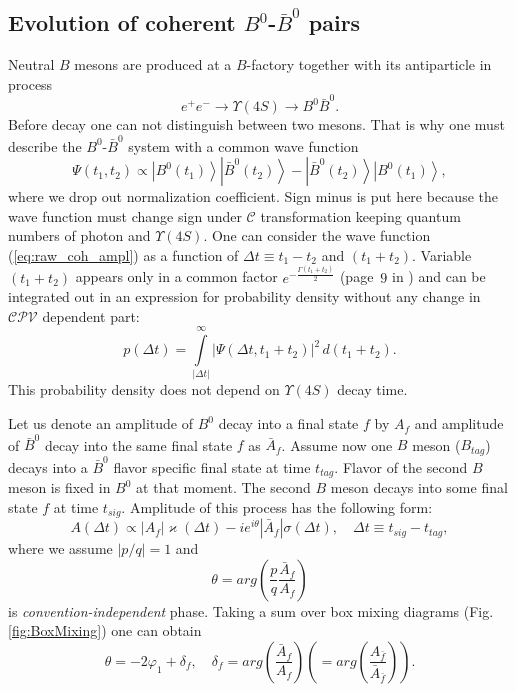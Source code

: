\documentclass[preprint,aps,showpacs]{revtex4}
\newcommand{\kapdt}{\varkappa\left(\Delta t\right)}
\newcommand{\sigdt}{\sigma\left(\Delta t\right)}
\newcommand{\dt}{\ensuremath{\Delta t}\xspace}
\newcommand{\cconj}{\ensuremath{\mathcal{C}}\xspace}
\newcommand{\cpvconj}{\ensuremath{\mathcal{CPV}}\xspace}
\newcommand{\bzta}{\left|B^0\left(t_1\right)\right>}
\newcommand{\bzbtb}{\left|\bar B^0\left(t_2\right)\right>}
\begin{document}
\subsection{Evolution of coherent $B^0$-$\bar B^0$ pairs}
Neutral $B$ mesons are produced at a $B$-factory together with its antiparticle in process
\begin{equation}
 e^+e^-\to\Upsilon(4S)\to B^0\bar B^0.
\end{equation}
Before decay one can not distinguish between two mesons. That is why one must describe the $B^0$-$\bar B^0$ system with a common wave function
\begin{equation}\label{eq:raw_coh_ampl}
 \Psi(t_1,t_2) \propto \bzta\bzbtb - \bzbtb\bzta,
\end{equation}
where we drop out normalization coefficient. Sign minus is put here because the wave function must change sign under \cconj transformation keeping quantum numbers of photon and $\Upsilon(4S)$. One can consider the wave function (\ref{eq:raw_coh_ampl}) as a function of $\Delta t\equiv t_1 - t_2$ and $(t_1+t_2)$. Variable $(t_1+t_2)$ appears only in a common factor $e^{-\frac{\Gamma(t_1+t_2)}{2}}$ (page~$9$ in \cite{BaBarBook}) and can be integrated out in an expression for probability density without any change in \cpvconj dependent part:
\begin{equation}
 p(\dt) = \int\limits_{|\dt|}^{\infty}|\Psi(\dt,t_1+t_2)|^2 \,d(t_1+t_2).
\end{equation}
This probability density does not depend on $\Upsilon(4S)$ decay time.

Let us denote an amplitude of $B^0$ decay into a final state $f$ by $A_f$ and amplitude of $\bar B^0$ decay into the same final state $f$ as $\bar A_{f}$. Assume now one $B$ meson ($B_{tag}$) decays into a $\bar B^0$ flavor specific final state at time $t_{tag}$. Flavor of the second $B$ meson is fixed in $B^0$ at that moment. The second $B$ meson decays into some final state $f$ at time $t_{sig}$. Amplitude of this process has the following form:
\begin{equation}\label{eq:coh_ampl}
 A(\Delta t) \propto \left|A_f\right|\kapdt - ie^{i\theta}\left|\bar A_f\right|\sigdt,\quad \Delta t\equiv t_{sig} - t_{tag},
\end{equation}
where we assume $\left|p/q\right|=1$ and
\begin{equation}
 \theta = arg\left(\frac{p}{q}\frac{\bar A_f}{A_f}\right)
\end{equation}
is {\it convention-independent} phase. Taking a sum over box mixing diagrams (Fig.\,\ref{fig:BoxMixing}) one can obtain
\begin{equation}
 \theta = -2\varphi_1 + \delta_{f},\quad \delta_{f} = arg\left(\frac{\bar A_f}{A_f}\right) \left( =arg\left(\frac{A_{\bar f}}{\bar A_{\bar f}}\right) \right).
\end{equation}
\end{document}
